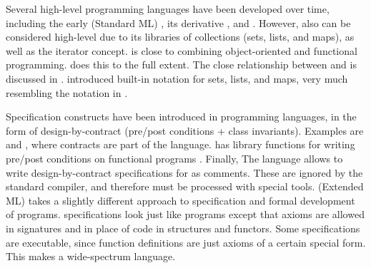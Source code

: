 Several high-level programming languages have been developed over
time, including the early \sml{} (Standard ML) \cite{standard-ml-97},
its derivative \ocaml{} \cite{ocaml}, and \haskell{}
\cite{haskell}. However, also \java{} can be considered high-level due
to its libraries of collections (sets, lists, and maps), as well as
the iterator concept. \python{} \cite{python} is close to combining
object-oriented and functional programming. \scala{} \cite{scala} does
this to the full extent. The close relationship between \scala{} and
\vdm{} is discussed in \cite{havelund-scala-vdm-12}.  \fortress{}
\cite{fortress} introduced built-in notation for sets, lists, and
maps, very much resembling the notation in \vdm{}.

Specification constructs have been introduced in programming
languages, in the form of design-by-contract (pre/post conditions +
class invariants). Examples are \eiffel{} \cite{eiffel} and
\specsharp{} \cite{specsharp}, where contracts are part of the
language. \scala{} has library functions for writing pre/post
conditions on functional programs \cite{odersky-rv10}. Finally, The
\jml{} language \cite{jml} allows to write design-by-contract
specifications for \java{} as comments. These are ignored by the
standard \java{} compiler, and therefore must be processed with
special tools. \eml{} (Extended ML) \cite{sannella-eml-97} takes a
slightly different approach to specification and formal development of
\sml{} programs.  \eml{} specifications look just like \sml{} programs
except that axioms are allowed in signatures and in place of code in
structures and functors. Some \eml{} specifications are executable,
since \sml{} function definitions are just axioms of a certain special
form. This makes \eml{} a wide-spectrum language.

